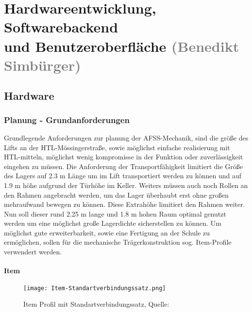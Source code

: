 \section{Hardwareentwicklung, Softwarebackend \\ und Benutzeroberfläche \textcolor{gray}{(Benedikt Simbürger)}}

\subsection{Hardware}

\subsubsection{Planung - Grundanforderungen}
Grundlegende Anforderungen zur planung der AFSS-Mechanik, sind die größe des Lifts an der HTL-Mössingerstraße, sowie möglichst einfache realisierung mit HTL-mitteln, möglichst wenig kompromisse in der Funktion oder zuverlässigkeit eingehen zu müssen.
Die Anforderung der Transportfähigkeit limitiert die Größe des Lagers auf 2.3 m Länge um im Lift transportiert werden zu können und auf 1.9 m höhe aufgrund der Türhöhe im Keller. Weiters müssen auch noch Rollen an den Rahmen angebracht werden, um das Lager überhaubt erst ohne großen mehraufwand bewegen zu können. Diese Extrahöhe limitiert den Rahmen weiter.
Nun soll dieser rund 2.25 m lange und 1.8 m hohen Raum optimal genutzt werden um eine möglichst große Lagerdichte sicherstellen zu können.
Um möglichst gute erweiterbarkeit, sowie eine Fertigung an der Schule zu ermöglichen, sollen für die mechanische Trägerkonstruktion sog. Item-Profile verwendert werden. 

\paragraph{Item}

\begin{wrapfigure}{r}{0.3\textwidth}
    \vspace{-7mm}
    \texttt{[image: Item-Standartverbindungssatz.png]}
    \centering
    \caption{Item Profil mit Standartverbindungssatz, Quelle: \cite{Item_svs}}
\end{wrapfigure}

